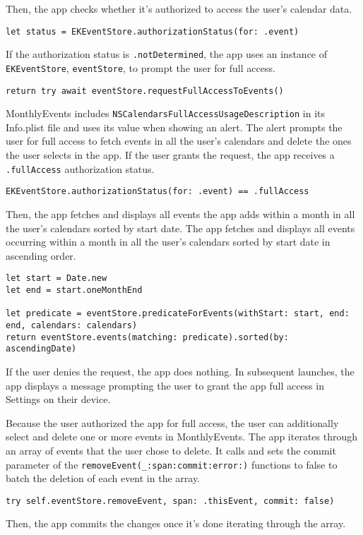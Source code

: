 \documentclass{article}
\begin{document}
Then, the app checks whether it's authorized to access the user's calendar data.

\texttt{let status = EKEventStore.authorizationStatus(for: .event)}

If the authorization status is \texttt{.notDetermined}, the app uses an instance of \texttt{EKEventStore}, \texttt{eventStore}, to prompt the user for full access.

\texttt{return try await eventStore.requestFullAccessToEvents()}

MonthlyEvents includes \texttt{NSCalendarsFullAccessUsageDescription} in its Info.plist file and uses its value when showing an alert. The alert prompts the user for full access to fetch events in all the user's calendars and delete the ones the user selects in the app. If the user grants the request, the app receives a \texttt{.fullAccess} authorization status.

\texttt{EKEventStore.authorizationStatus(for: .event) == .fullAccess}

Then, the app fetches and displays all events the app adds within a month in all the user's calendars sorted by start date. The app fetches and displays all events occurring within a month in all the user’s calendars sorted by start date in ascending order.

\begin{verbatim}
let start = Date.new
let end = start.oneMonthEnd

let predicate = eventStore.predicateForEvents(withStart: start, end: end, calendars: calendars)
return eventStore.events(matching: predicate).sorted(by: ascendingDate)
\end{verbatim}

If the user denies the request, the app does nothing. In subsequent launches, the app displays a message prompting the user to grant the app full access in Settings on their device.

Because the user authorized the app for full access, the user can additionally select and delete one or more events in MonthlyEvents. The app iterates through an array of events that the user chose to delete. It calls and sets the commit parameter of the \texttt{removeEvent(_:span:commit:error:)} functions to false to batch the deletion of each event in the array.

\texttt{try self.eventStore.removeEvent, span: .thisEvent, commit: false)}

Then, the app commits the changes once it's done iterating through the array.
\end{document}
